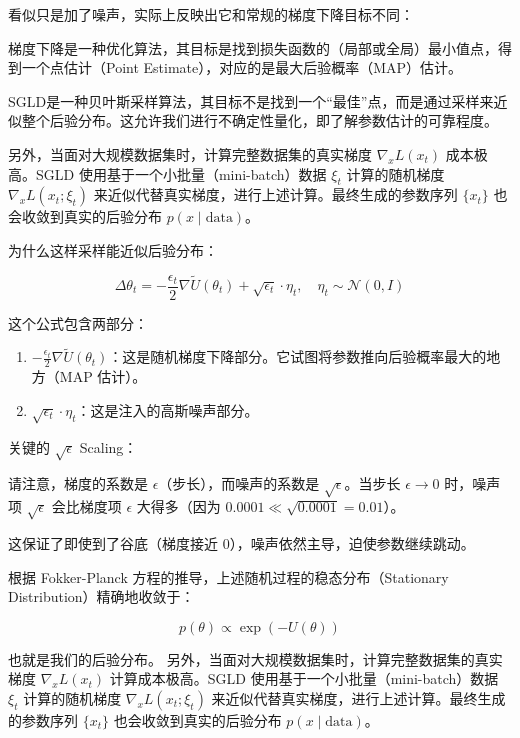 看似只是加了噪声，实际上反映出它和常规的梯度下降目标不同：

梯度下降是一种优化算法，其目标是找到损失函数的（局部或全局）最小值点，得到一个点估计（Point Estimate），对应的是最大后验概率（MAP）估计。

SGLD是一种贝叶斯采样算法，其目标不是找到一个``最佳''点，而是通过采样来近似整个后验分布。这允许我们进行不确定性量化，即了解参数估计的可靠程度。

另外，当面对大规模数据集时，计算完整数据集的真实梯度 \(\nabla_x L(x_t)\) 成本极高。SGLD 使用基于一个小批量（mini-batch）数据 \(\xi_t\) 计算的随机梯度 \(\nabla_x L(x_t;\xi_t)\) 来近似代替真实梯度，进行上述计算。最终生成的参数序列 \(\{x_t\}\) 也会收敛到真实的后验分布 \(p(x\mid\mathrm{data})\)。

为什么这样采样能近似后验分布：

\[
\Delta\theta_t=-\frac{\epsilon_t}{2}\nabla\tilde{U}(\theta_t)+\sqrt{\epsilon_t}\cdot\eta_t,\quad \eta_t\sim\mathcal{N}(0,I)
\]

这个公式包含两部分：

\begin{enumerate}
\def\labelenumi{\arabic{enumi}.}
\tightlist
\item
  \(-\frac{\epsilon_t}{2}\nabla\tilde{U}(\theta_t)\)：这是随机梯度下降部分。它试图将参数推向后验概率最大的地方（MAP 估计）。
\item
  \(\sqrt{\epsilon_t}\cdot\eta_t\)：这是注入的高斯噪声部分。
\end{enumerate}

关键的 \(\sqrt{\epsilon}\) Scaling：

请注意，梯度的系数是 \(\epsilon\)（步长），而噪声的系数是 \(\sqrt{\epsilon}\)。当步长 \(\epsilon\to 0\) 时，噪声项 \(\sqrt{\epsilon}\) 会比梯度项 \(\epsilon\) 大得多（因为 \(0.0001\ll\sqrt{0.0001}=0.01\)）。

这保证了即使到了谷底（梯度接近 0），噪声依然主导，迫使参数继续跳动。

根据 Fokker-Planck 方程的推导，上述随机过程的稳态分布（Stationary Distribution）精确地收敛于：

\[
p(\theta)\propto \exp(-U(\theta))
\]

也就是我们的后验分布。
另外，当面对大规模数据集时，计算完整数据集的真实梯度 \(\nabla_x L(x_t)\) 计算成本极高。SGLD 使用基于一个小批量（mini-batch）数据 \(\xi_t\) 计算的随机梯度 \(\nabla_x L(x_t;\xi_t)\) 来近似代替真实梯度，进行上述计算。最终生成的参数序列 \(\{x_t\}\) 也会收敛到真实的后验分布 \(p(x\mid\mathrm{data})\)。


